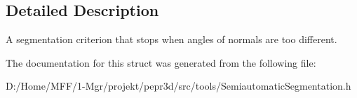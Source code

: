\subsection{Detailed Description}
A segmentation criterion that stops when angles of normals are too different. 

The documentation for this struct was generated from the following file\+:\begin{DoxyCompactItemize}
\item 
D\+:/\+Home/\+M\+F\+F/1-\/\+Mgr/projekt/pepr3d/src/tools/Semiautomatic\+Segmentation.\+h\end{DoxyCompactItemize}
